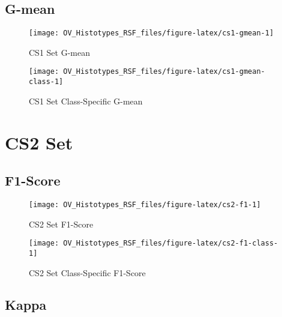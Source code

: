 \documentclass[
]{report}
\begin{document}
\hypertarget{g-mean-1}{%
\subsection{G-mean}\label{g-mean-1}}

\begin{figure}[H]

{\centering \texttt{[image: OV\_Histotypes\_RSF\_files/figure-latex/cs1-gmean-1]} 

}

\caption{CS1 Set G-mean}\label{fig:cs1-gmean}
\end{figure}

\begin{figure}[H]

{\centering \texttt{[image: OV\_Histotypes\_RSF\_files/figure-latex/cs1-gmean-class-1]} 

}

\caption{CS1 Set Class-Specific G-mean}\label{fig:cs1-gmean-class}
\end{figure}

\hypertarget{cs2-set}{%
\section{CS2 Set}\label{cs2-set}}

\hypertarget{f1-score-2}{%
\subsection{F1-Score}\label{f1-score-2}}

\begin{figure}[H]

{\centering \texttt{[image: OV\_Histotypes\_RSF\_files/figure-latex/cs2-f1-1]} 

}

\caption{CS2 Set F1-Score}\label{fig:cs2-f1}
\end{figure}

\begin{figure}[H]

{\centering \texttt{[image: OV\_Histotypes\_RSF\_files/figure-latex/cs2-f1-class-1]} 

}

\caption{CS2 Set Class-Specific F1-Score}\label{fig:cs2-f1-class}
\end{figure}

\hypertarget{kappa-2}{%
\subsection{Kappa}\label{kappa-2}}
\end{document}
